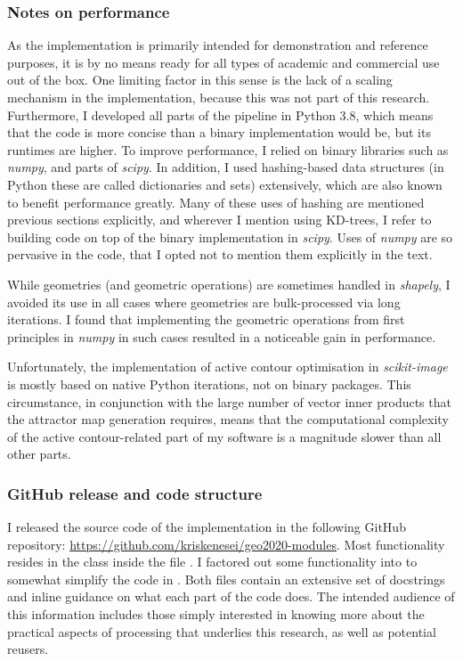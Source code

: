 \subsubsection{Notes on performance}

As the implementation is primarily intended for demonstration and reference purposes, it is by no means ready for all types of academic and commercial use out of the box. One limiting factor in this sense is the lack of a scaling mechanism in the implementation, because this was not part of this research. Furthermore, I developed all parts of the pipeline in Python 3.8, which means that the code is more concise than a binary implementation would be, but its runtimes are higher. To improve performance, I relied on binary libraries such as \textit{numpy}, and parts of \textit{scipy}. In addition, I used hashing-based data structures (in Python these are called dictionaries and sets) extensively, which are also known to benefit performance greatly. Many of these uses of hashing are mentioned previous sections explicitly, and wherever I mention using KD-trees, I refer to building code on top of the binary implementation in \textit{scipy}. Uses of \textit{numpy} are so pervasive in the code, that I opted not to mention them explicitly in the text.

While geometries (and geometric operations) are sometimes handled in \textit{shapely}, I avoided its use in all cases where geometries are bulk-processed via long iterations. I found that implementing the geometric operations from first principles in \textit{numpy} in such cases resulted in a noticeable gain in performance.

Unfortunately, the implementation of active contour optimisation in \textit{scikit-image} is mostly based on native Python iterations, not on binary packages. This circumstance, in conjunction with the large number of vector inner products that the attractor map generation requires, means that the computational complexity of the active contour-related part of my software is a magnitude slower than all other parts.

\subsubsection{GitHub release and code structure}

I released the source code of the implementation in the following GitHub repository:
\url{https://github.com/kriskenesei/geo2020-modules}. Most functionality resides in the class  inside the file . I factored out some functionality into  to somewhat simplify the code in . Both files contain an extensive set of docstrings and inline guidance on what each part of the code does. The intended audience of this information includes those simply interested in knowing more about the practical aspects of processing that underlies this research, as well as potential reusers.

